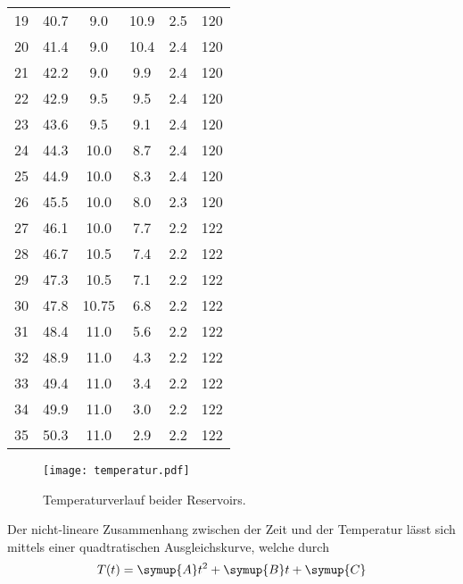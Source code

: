 \begin{table}
\begin{tabular}{S[table-format = 2.0] S[table-format = 2.1] S[table-format = 2.2] S[table-format = 2.1]
     S[table-format = 1.1] S[table-format = 3.0]}
    19	& 40.7 &	9.0    &	10.9 & 2.5 & 120 \\
    20	& 41.4 &	9.0    &	10.4 & 2.4 & 120 \\
    21	& 42.2 &	9.0    &	9.9	 & 2.4 & 120 \\
    22	& 42.9 &	9.5    &	9.5	 & 2.4 & 120 \\
    23	& 43.6 &	9.5    &	9.1	 & 2.4 & 120 \\
    24	& 44.3 &	10.0   &  8.7  &2.4  & 120 \\
    25	& 44.9 &	10.0   &  8.3  &2.4  & 120 \\
    26	& 45.5 &	10.0   &  8.0  &2.3  & 120 \\
    27	& 46.1 &	10.0   &  7.7  &2.2  & 122 \\
    28	& 46.7 &	10.5   &  7.4  &2.2  & 122 \\
    29	& 47.3 &	10.5   &  7.1  &2.2  & 122 \\
    30	& 47.8 &	10.75  &  6.8  &2.2  & 122 \\
    31	& 48.4 &	11.0   &  5.6  &2.2  & 122 \\
    32	& 48.9 &	11.0   &  4.3  &2.2  & 122 \\
    33	& 49.4 &	11.0   &  3.4  &2.2  & 122 \\
    34	& 49.9 &	11.0   &  3.0  &2.2  & 122 \\
    35	& 50.3 &	11.0   &  2.9  &2.2  & 122 \\
    \bottomrule 
  \end{tabular}
\end{table}
\begin{figure}
  \centering
  \texttt{[image: temperatur.pdf]}
  \caption{Temperaturverlauf beider Reservoirs.}
  \label{fig:temperatur}
\end{figure}
Der nicht-lineare Zusammenhang zwischen der Zeit und der Temperatur lässt sich mittels einer quadtratischen Ausgleichskurve, welche durch 
\begin{equation}
  T(t) = \symup{A}t^2 + \symup{B}t + \symup{C}
\end{equation}
